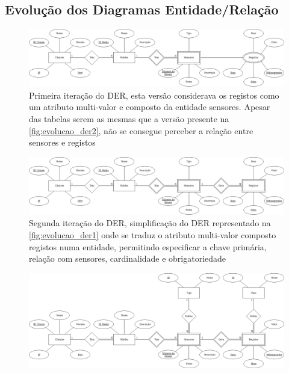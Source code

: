\documentclass[11pt,twoside,a4paper]{report}
\begin{document}
\cleardoublepage
\begin{landscape}
\chapter{Evolução dos Diagramas Entidade/Relação}
\label{apen:DER}
\begin{figure}[H]
	\begin{center}
		\includegraphics[width=1.4\textwidth]{evolucao_der2} %
		\caption[Primeira iteração do Diagrama Entidade/Relação]{Primeira iteração do DER, esta versão considerava os registos como um atributo multi-valor e composto da entidade sensores. Apesar das tabelas serem as mesmas que a versão presente na \autoref{fig:evolucao_der2}, não se consegue perceber a relação entre sensores e registos}
		\label{fig:evolucao_der1}
	\end{center}
\end{figure}
\begin{figure}
	\begin{center}
		\includegraphics[width=1.4\textwidth]{evolucao_der1} %
		\caption[Segunda iteração do Diagrama Entidade/Relação]{Segunda iteração do DER, simplificação do DER representado na \autoref{fig:evolucao_der1} onde se traduz o atributo multi-valor composto registos numa entidade, permitindo especificar a chave primária, relação com sensores, cardinalidade e obrigatoriedade}
		\label{fig:evolucao_der2}
	\end{center}
\end{figure}
\begin{figure}
	\begin{center}
		\includegraphics[width=1.4\textwidth]{diagrama_entidade_relacao} %

\end{center}
\end{figure}
\end{landscape}
\end{document}
